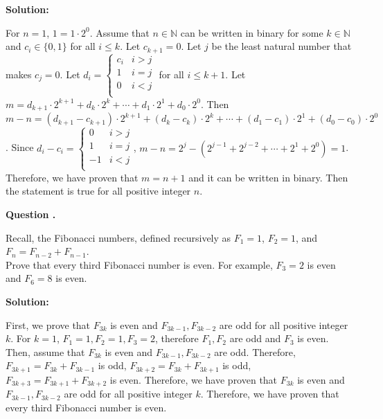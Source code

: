 \documentclass[12pt]{article}
\newcounter{questionnumber}
\newenvironment{question}[1][]{\stepcounter{questionnumber}\par\noindent\textbf{Question \thequestionnumber. #1}\par}{\par}
\newenvironment{solution}{\par\noindent\textbf{Solution:}\par}{\par\vspace{1em}}
\begin{document}
\begin{solution}
    For $n=1$, $1=1\cdot 2^0$.
    Assume that $n \in \mathbb{N}$ can be written in binary for some $k\in\mathbb{N}$ and $c_i\in\{0,1\}$ for all $i\leq k.$
    Let $c_{k+1}=0$. Let $j$ be the least natural number that makes $c_j=0$.
    Let $d_i=\begin{cases}
	c_i&		i>j\\
	1&		i=j\\
	0&		i<j\\
    \end{cases}$ for all $i \leq k+1$.
    Let $m=d_{k+1}\cdot2^{k+1}+d_k\cdot2^k+\cdots+d_1\cdot2^1+d_0\cdot2^0$.
    Then $m-n=(d_{k+1}-c_{k+1})\cdot2^{k+1}+(d_k-c_k)\cdot2^k+\cdots+(d_1-c_1)\cdot2^1+(d_0-c_0)\cdot2^0$.
    Since $d_i-c_i=\begin{cases}
	0&		i>j\\
	1&		i=j\\
	-1&		i<j\\
    \end{cases}$, $m-n=2^j-(2^{j-1}+2^{j-2}+\cdots+2^1+2^0)=1$.
    Therefore, we have proven that $m=n+1$ and it can be written in binary. Then the statement is true for all positive integer $n$.
\end{solution}
\begin{question}
    Recall, the Fibonacci numbers, defined recursively as
    $F_{1}=1$, $F_{2}=1$, and $F_{n}=F_{n-2}+F_{n-1}$.\\
    Prove that every third Fibonacci number is even. For example, $F_{3}=2$ is even and $F_{6}=8$ is even.
\end{question}
\begin{solution}
    First, we prove that $F_{3k}$ is even and $F_{3k-1}, F_{3k-2}$ are odd for all positive integer $k$.
    For $k=1$, $F_1=1, F_2=1, F_3= 2$, therefore $F_1, F_2$ are odd and $F_3$ is even. Then, assume that $F_{3k}$ is even and $F_{3k-1}, F_{3k-2}$ are odd.
    Therefore, $F_{3k+1}=F_{3k}+F_{3k-1}$ is odd, $F_{3k+2}=F_{3k}+F_{3k+1}$ is odd, $F_{3k+3}=F_{3k+1}+F_{3k+2}$ is even. Therefore, we have proven that $F_{3k}$ is even and $F_{3k-1}, F_{3k-2}$ are odd for all positive integer $k$.
    Therefore, we have proven that every third Fibonacci number is even.
\end{solution}
\end{document}
